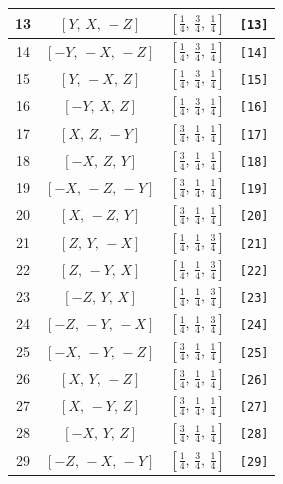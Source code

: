 \documentclass[fleqn,8pt]{jsarticle}
\begin{document}
\begin{longtable}{cccc}
13 & $\left[ Y,\, X,\, - Z \right]$ & $\left[ \frac{1}{4},\, \frac{3}{4},\, \frac{1}{4} \right]$ & {\tt [13]} \\ \hline
14 & $\left[ - Y,\, - X,\, - Z \right]$ & $\left[ \frac{1}{4},\, \frac{3}{4},\, \frac{1}{4} \right]$ & {\tt [14]} \\ \hline
15 & $\left[ Y,\, - X,\, Z \right]$ & $\left[ \frac{1}{4},\, \frac{3}{4},\, \frac{1}{4} \right]$ & {\tt [15]} \\ \hline
16 & $\left[ - Y,\, X,\, Z \right]$ & $\left[ \frac{1}{4},\, \frac{3}{4},\, \frac{1}{4} \right]$ & {\tt [16]} \\ \hline
17 & $\left[ X,\, Z,\, - Y \right]$ & $\left[ \frac{3}{4},\, \frac{1}{4},\, \frac{1}{4} \right]$ & {\tt [17]} \\ \hline
18 & $\left[ - X,\, Z,\, Y \right]$ & $\left[ \frac{3}{4},\, \frac{1}{4},\, \frac{1}{4} \right]$ & {\tt [18]} \\ \hline
19 & $\left[ - X,\, - Z,\, - Y \right]$ & $\left[ \frac{3}{4},\, \frac{1}{4},\, \frac{1}{4} \right]$ & {\tt [19]} \\ \hline
20 & $\left[ X,\, - Z,\, Y \right]$ & $\left[ \frac{3}{4},\, \frac{1}{4},\, \frac{1}{4} \right]$ & {\tt [20]} \\ \hline
21 & $\left[ Z,\, Y,\, - X \right]$ & $\left[ \frac{1}{4},\, \frac{1}{4},\, \frac{3}{4} \right]$ & {\tt [21]} \\ \hline
22 & $\left[ Z,\, - Y,\, X \right]$ & $\left[ \frac{1}{4},\, \frac{1}{4},\, \frac{3}{4} \right]$ & {\tt [22]} \\ \hline
23 & $\left[ - Z,\, Y,\, X \right]$ & $\left[ \frac{1}{4},\, \frac{1}{4},\, \frac{3}{4} \right]$ & {\tt [23]} \\ \hline
24 & $\left[ - Z,\, - Y,\, - X \right]$ & $\left[ \frac{1}{4},\, \frac{1}{4},\, \frac{3}{4} \right]$ & {\tt [24]} \\ \hline
25 & $\left[ - X,\, - Y,\, - Z \right]$ & $\left[ \frac{3}{4},\, \frac{1}{4},\, \frac{1}{4} \right]$ & {\tt [25]} \\ \hline
26 & $\left[ X,\, Y,\, - Z \right]$ & $\left[ \frac{3}{4},\, \frac{1}{4},\, \frac{1}{4} \right]$ & {\tt [26]} \\ \hline
27 & $\left[ X,\, - Y,\, Z \right]$ & $\left[ \frac{3}{4},\, \frac{1}{4},\, \frac{1}{4} \right]$ & {\tt [27]} \\ \hline
28 & $\left[ - X,\, Y,\, Z \right]$ & $\left[ \frac{3}{4},\, \frac{1}{4},\, \frac{1}{4} \right]$ & {\tt [28]} \\ \hline
29 & $\left[ - Z,\, - X,\, - Y \right]$ & $\left[ \frac{1}{4},\, \frac{3}{4},\, \frac{1}{4} \right]$ & {\tt [29]} \\ \hline

\end{longtable}
\end{document}
